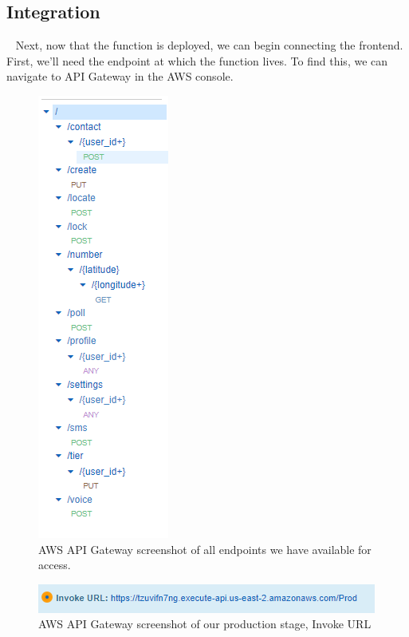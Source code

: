 \documentclass[10pt, a4paper]{article}
\begin{document}
\subsection{Integration}
\par ~ Next, now that the function is deployed, we can begin connecting the frontend. First, we'll need the endpoint at which the function lives. To find this, we can navigate to API Gateway in the AWS console.
\begin{figure}[H]
\begin{center}
  \includegraphics[scale=1]{code-screenshots/all-endpoints.PNG}
  \caption{AWS API Gateway screenshot of all endpoints we have available for access.}
\end{center}
\end{figure}

\begin{figure}[H]
\begin{center}
  \includegraphics[scale=1]{code-screenshots/invoke-url.PNG}
  \caption{AWS API Gateway screenshot of our production stage, Invoke URL}
\end{center}
\end{figure}
\end{document}
